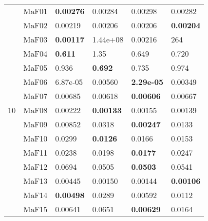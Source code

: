 \documentclass[]{article}
\begin{document}
\begin{table}
\begin{footnotesize}
\begin{tabular}{|l|l|l|l|l|l|}
\multirow{15}{*}{10} & MaF01 & \cellcolor{gray95} {\bf 0.00276} & \cellcolor{gray95} 0.00284 & 0.00298 & 0.00282\\
 & MaF02 & 0.00219 & \cellcolor{gray95} 0.00206 & \cellcolor{gray95} 0.00206 & \cellcolor{gray95} {\bf 0.00204}\\
 & MaF03 & \cellcolor{gray95} {\bf 0.00117} & 1.44e+08 & \cellcolor{gray95} 0.00216 & 264\\
 & MaF04 & \cellcolor{gray95} {\bf 0.611} & 1.35 & \cellcolor{gray95} 0.649 & 0.720\\
 & MaF05 & 0.936 & \cellcolor{gray95} {\bf 0.692} & \cellcolor{gray95} 0.735 & 0.974\\
 & MaF06 & 6.87e-05 & 0.00560 & \cellcolor{gray95} {\bf 2.29e-05} & 0.00349\\
 & MaF07 & 0.00685 & \cellcolor{gray95} 0.00618 & \cellcolor{gray95} {\bf 0.00606} & 0.00667\\
 & MaF08 & 0.00222 & \cellcolor{gray95} {\bf 0.00133} & 0.00155 & 0.00139\\
 & MaF09 & 0.00852 & 0.0318 & \cellcolor{gray95} {\bf 0.00247} & 0.0133\\
 & MaF10 & 0.0299 & \cellcolor{gray95} {\bf 0.0126} & 0.0166 & 0.0153\\
 & MaF11 & 0.0238 & \cellcolor{gray95} 0.0198 & \cellcolor{gray95} {\bf 0.0177} & 0.0247\\
 & MaF12 & 0.0694 & \cellcolor{gray95} 0.0505 & \cellcolor{gray95} {\bf 0.0503} & 0.0541\\
 & MaF13 & 0.00445 & 0.00150 & 0.00144 & \cellcolor{gray95} {\bf 0.00106}\\
 & MaF14 & \cellcolor{gray95} {\bf 0.00498} & 0.0289 & \cellcolor{gray95} 0.00592 & 0.0112\\
 & MaF15 & \cellcolor{gray95} 0.00641 & 0.0651 & \cellcolor{gray95} {\bf 0.00629} & 0.0164\\
\hline


\end{tabular}
\end{footnotesize}
\end{table}
\end{document}
